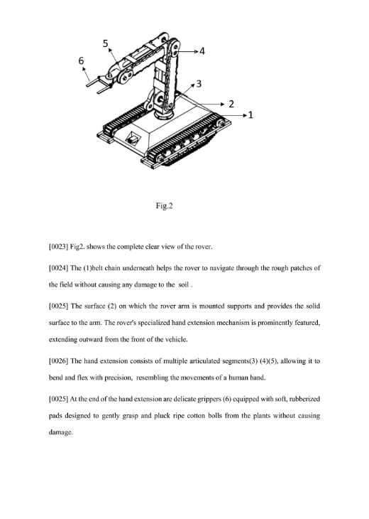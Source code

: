 \documentclass[12pt,a4paper]{report}
\begin{document}
\includegraphics[scale =0.7]{images/patent/patent_doc/output-0005.jpg}
\newpage
\end{document}
